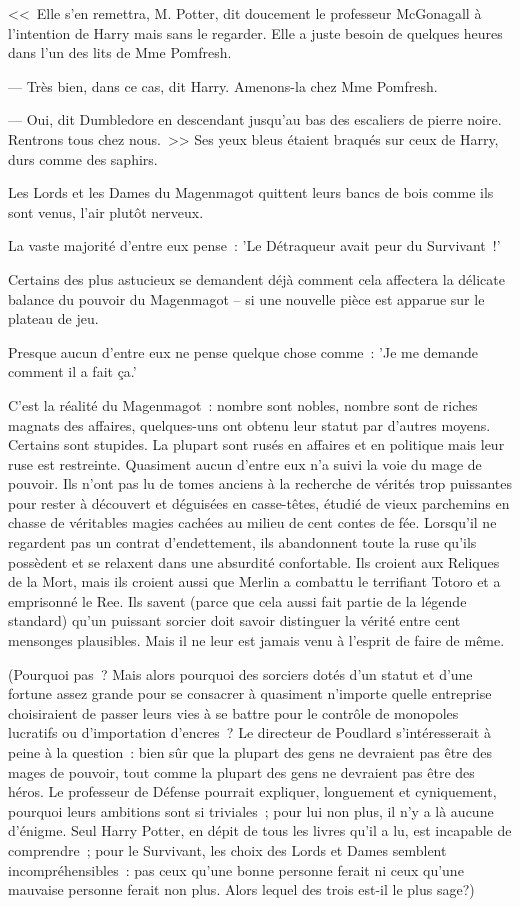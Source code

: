<<~Elle s'en remettra, M. Potter, dit doucement le professeur McGonagall à l'intention de Harry mais sans le regarder. Elle a juste besoin de quelques heures dans l'un des lits de Mme Pomfresh.

--- Très bien, dans ce cas, dit Harry. Amenons-la chez Mme Pomfresh.

--- Oui, dit Dumbledore en descendant jusqu'au bas des escaliers de pierre noire. Rentrons tous chez nous.~>> Ses yeux bleus étaient braqués sur ceux de Harry, durs comme des saphirs.

\later

Les Lords et les Dames du Magenmagot quittent leurs bancs de bois comme ils sont venus, l'air plutôt nerveux.

La vaste majorité d'entre eux pense~: 'Le Détraqueur avait peur du Survivant~!'

Certains des plus astucieux se demandent déjà comment cela affectera la délicate balance du pouvoir du Magenmagot -- si une nouvelle pièce est apparue sur le plateau de jeu.

Presque aucun d'entre eux ne pense quelque chose comme~: 'Je me demande comment il a fait ça.'

C'est la réalité du Magenmagot~: nombre sont nobles, nombre sont de riches magnats des affaires, quelques-uns ont obtenu leur statut par d'autres moyens. Certains sont stupides. La plupart sont rusés en affaires et en politique mais leur ruse est restreinte. Quasiment aucun d'entre eux n'a suivi la voie du mage de pouvoir. Ils n'ont pas lu de tomes anciens à la recherche de vérités trop puissantes pour rester à découvert et déguisées en casse-têtes, étudié de vieux parchemins en chasse de véritables magies cachées au milieu de cent contes de fée. Lorsqu'il ne regardent pas un contrat d'endettement, ils abandonnent toute la ruse qu'ils possèdent et se relaxent dans une absurdité confortable. Ils croient aux Reliques de la Mort, mais ils croient aussi que Merlin a combattu le terrifiant Totoro et a emprisonné le Ree. Ils savent (parce que cela aussi fait partie de la légende standard) qu'un puissant sorcier doit savoir distinguer la vérité entre cent mensonges plausibles. Mais il ne leur est jamais venu à l'esprit de faire de même.

(Pourquoi pas~? Mais alors pourquoi des sorciers dotés d'un statut et d'une fortune assez grande pour se consacrer à quasiment n'importe quelle entreprise choisiraient de passer leurs vies à se battre pour le contrôle de monopoles lucratifs ou d'importation d'encres~? Le directeur de Poudlard s'intéresserait à peine à la question~: bien sûr que la plupart des gens ne devraient pas être des mages de pouvoir, tout comme la plupart des gens ne devraient pas être des héros. Le professeur de Défense pourrait expliquer, longuement et cyniquement, pourquoi leurs ambitions sont si triviales~; pour lui non plus, il n'y a là aucune d'énigme. Seul Harry Potter, en dépit de tous les livres qu'il a lu, est incapable de comprendre~; pour le Survivant, les choix des Lords et Dames semblent incompréhensibles~: pas ceux qu'une bonne personne ferait ni ceux qu'une mauvaise personne ferait non plus. Alors lequel des trois est-il le plus sage?)

